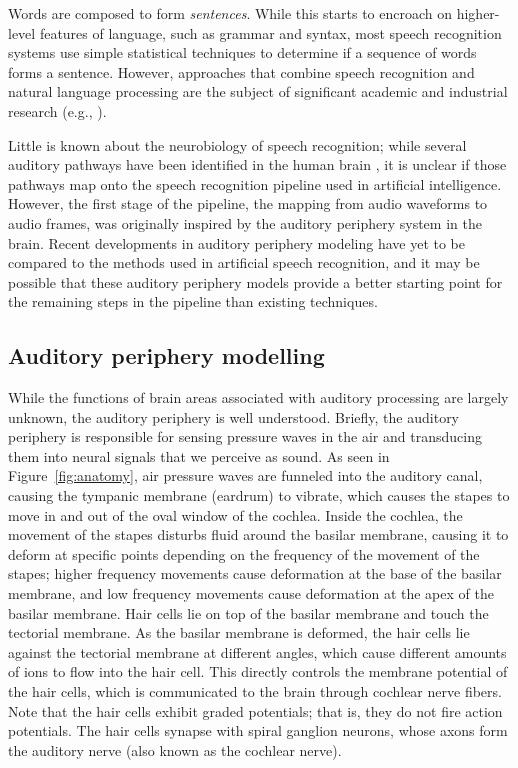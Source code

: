 \documentclass{article}
\begin{document}
Words are composed to form \textit{sentences}.
While this starts to encroach
on higher-level features of language,
such as grammar and syntax,
most speech recognition systems
use simple statistical techniques
to determine if a sequence of words
forms a sentence.
However, approaches that combine
speech recognition and natural language processing
are the subject of significant
academic and industrial research
(e.g., \citealp{sagae2009}).

Little is known about the neurobiology
of speech recognition;
while several auditory pathways have been identified
in the human brain \citep{scott2003},
it is unclear if those pathways map onto
the speech recognition pipeline
used in artificial intelligence.
However, the first stage of the pipeline,
the mapping from audio waveforms
to audio frames, was originally inspired
by the auditory periphery system
in the brain.
Recent developments in auditory periphery modeling
have yet to be compared to the methods used
in artificial speech recognition,
and it may be possible that
these auditory periphery models
provide a better starting point
for the remaining steps in the pipeline
than existing techniques.

\subsection{Auditory periphery modelling}
\label{subsec:periphery}

While the functions of brain areas
associated with auditory processing
are largely unknown,
the auditory periphery is well understood.
Briefly, the auditory periphery
is responsible for sensing pressure waves
in the air and transducing them into
neural signals that we perceive as sound.
As seen in Figure~\ref{fig:anatomy},
air pressure waves are funneled into the auditory canal,
causing the tympanic membrane (eardrum)
to vibrate, which causes the stapes
to move in and out of the oval window of the cochlea.
Inside the cochlea, the movement of the stapes
disturbs fluid around the basilar membrane,
causing it to deform at specific points
depending on the frequency of the movement
of the stapes; higher frequency movements
cause deformation at the base of the basilar membrane,
and low frequency movements cause deformation
at the apex of the basilar membrane.
Hair cells lie on top of the basilar membrane
and touch the tectorial membrane.
As the basilar membrane is deformed,
the hair cells lie against
the tectorial membrane at different angles,
which cause different amounts of ions
to flow into the hair cell.
This directly controls the membrane potential
of the hair cells,
which is communicated
to the brain through cochlear nerve fibers.
Note that the hair cells exhibit graded potentials;
that is, they do not fire action potentials.
The hair cells synapse with spiral ganglion neurons,
whose axons form the auditory nerve
(also known as the cochlear nerve).
\end{document}
